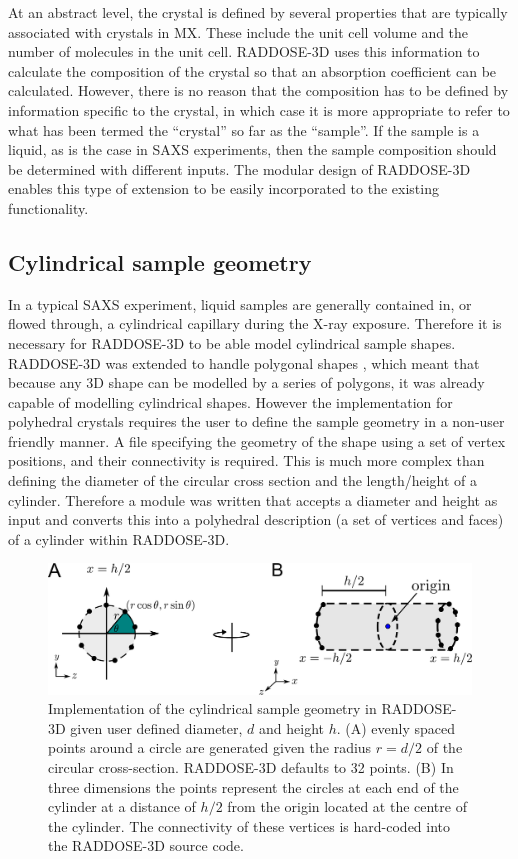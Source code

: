 At an abstract level, the crystal is defined by several properties that are typically associated with crystals in MX.
These include the unit cell volume and the number of molecules in the unit cell.
RADDOSE-3D uses this information to calculate the composition of the crystal so that an absorption coefficient can be calculated.
However, there is no reason that the composition has to be defined by information specific to the crystal, in which case it is more appropriate to refer to what has been termed the ``crystal'' so far as the ``sample''.
If the sample is a liquid, as is the case in SAXS experiments, then the sample composition should be determined with different inputs.
The modular design of RADDOSE-3D enables this type of extension to be easily incorporated to the existing functionality.

\subsection{Cylindrical sample geometry}
\label{sub:Cylindrical sample geometry}
In a typical SAXS experiment, liquid samples are generally contained in, or flowed through, a cylindrical capillary during the X-ray exposure.
Therefore it is necessary for RADDOSE-3D to be able model cylindrical sample shapes.
RADDOSE-3D was extended to handle polygonal shapes \cite{bury2015radiation}, which meant that because any 3D shape can be modelled by a series of polygons, it was already capable of modelling cylindrical shapes.
However the implementation for polyhedral crystals requires the user to define the sample geometry in a non-user friendly manner.
A file specifying the geometry of the shape using a set of vertex positions, and their connectivity is required.
This is much more complex than defining the diameter of the circular cross section and the length/height of a cylinder.
Therefore a module was written that accepts a diameter and height as input and converts this into a polyhedral description (a set of vertices and faces) of a cylinder within RADDOSE-3D.
\begin{figure}
    \centering
    \includegraphics[width=1\textwidth]{figures/saxs/cylinder_implementation.pdf}
    \caption{Implementation of the cylindrical sample geometry in RADDOSE-3D given user defined diameter, $d$ and height $h$. (A) evenly spaced points around a circle are generated given the radius $r = d/2$ of the circular cross-section. RADDOSE-3D defaults to 32 points. (B) In three dimensions the points represent the circles at each end of the cylinder at a distance of $h/2$ from the origin located at the centre of the cylinder. The connectivity of these vertices is hard-coded into the RADDOSE-3D source code.}
    \label{fig:Cylindrical implementation}
\end{figure}

